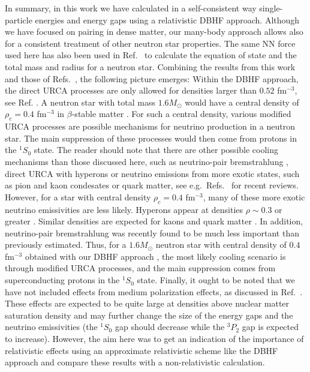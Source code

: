 In summary, in this work we have calculated in a self-consistent
way single-particle energies and energy gaps using a relativistic
DBHF approach. 
Although we have focused on  
pairing in dense matter, our many-body 
approach allows also for a consistent
treatment of other neutron star properties.
The same NN force used here has also been used in Ref.\ \cite{ehobo96}
to calculate the equation of state 
and the total mass and radius for a neutron star.
Combining the results from this work and those of Refs.\  
\cite{eeho96c,ehobo96},
the following picture emerges:\newline 
Within the DBHF approach,
the direct URCA processes are only allowed for densities larger 
than $0.52$ fm$^{-3}$, see Ref. \cite{eeho96c}. A neutron star
with total mass $1.6 M_{\odot}$ would have a central density of
$\rho_c=0.4$ fm$^{-3}$ in  $\beta$-stable matter \cite{ehobo96}.  
For such a central density, various modified URCA processes 
are possible  mechanisms for neutrino production in a neutron star.
The main suppression of these processes would then come
from protons in the $^1S_0$ state.  The reader should note that there
are other possible cooling mechanisms than those discussed here, 
such as neutrino-pair bremstrahlung \cite{pt94}, 
direct URCA with hyperons
or neutrino emissions from
more exotic states, such as pion and kaon condesates or quark matter,
see e.g.\ Refs.\ \cite{page94,prakash94,swwg96} for recent reviews.
However, for a star with central density $\rho_c=0.4$ fm$^{-3}$, 
many of these more exotic neutrino emissivities are less likely. 
Hyperons appear at densities $\rho \sim 0.3$ or greater \cite{kpe95}.
Similar densities are expected for kaons and quark matter 
\cite{swwg96,kpe95}. In addition, neutrino-pair bremstrahlung
was recently found \cite{pt94} to be much less important than previously
estimated. Thus, for a $1.6 M_{\odot}$ neutron star with central density of
$0.4$ fm$^{-3}$ obtained with our DBHF approach \cite{ehobo96}, the most likely
cooling scenario is through modified URCA processes, and the 
main suppression comes from superconducting protons in the $^1S_0$ state.
Finally, 
it ought to be noted that we have not included effects from 
medium polarization effects, as discussed in Ref.\ \cite{wap93}. 
These effects
are expected to be quite large at densities above nuclear matter
saturation density  and may 
further change the size of the energy gaps and the neutrino
emissivities (the $^1S_0$ gap should  decrease
while the $^3P_2$ gap is expected to increase). However, 
the aim
here was to get an indication of the importance of relativistic
effects using 
an approximate relativistic scheme
like the DBHF approach and compare these results
with a non-relativistic calculation.



